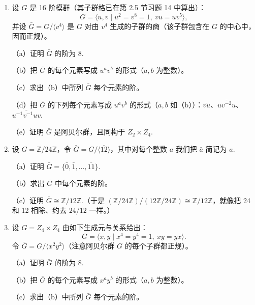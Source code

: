 \begin{enumerate}
（b）把 \(\bar{G}\) 的每个元素写成 \(\tau^a a^b\) 的形式（\(a, b\) 为整数）。

（c）求出（b）中所列 \(\bar{G}\) 每个元素的阶。

（d）把 \(\bar{G}\) 的下列每个元素写成 \(\tau^a a^b\) 的形式（\(a, b\) 如（b））：\(\overline{a\tau}\)、\(\overline{\tau a^{-2}\tau}\)、\(\overline{\tau^{-1}a^{-1}\tau a}\).

（e）证明 \(\bar{G} \cong D_8\).

\item 设 \(G\) 是 16 阶模群（其子群格已在第 2.5 节习题 14 中算出）：
\[
G = \langle u, v \mid u^2 = v^8 = 1,\ vu = uv^5 \rangle,
\]
并设 \(\bar{G} = G/\langle v^4 \rangle\) 是 \(G\) 对由 \(v^4\) 生成的子群的商（该子群包含在 \(G\) 的中心中，因而正规）。

（a）证明 \(\bar{G}\) 的阶为 8.

（b）把 \(\bar{G}\) 的每个元素写成 \(u^a v^b\) 的形式（\(a, b\) 为整数）。

（c）求出（b）中所列 \(\bar{G}\) 每个元素的阶。

（d）把 \(\bar{G}\) 的下列每个元素写成 \(u^a v^b\) 的形式（\(a, b\) 如（b））：\(\overline{vu}\)、\(\overline{uv^{-2}u}\)、\(\overline{u^{-1}v^{-1}uv}\).

（e）证明 \(\bar{G}\) 是阿贝尔群，且同构于 \(Z_2 \times Z_4\).

\item 设 \(G = \mathbb{Z}/24\mathbb{Z}\)，令 \(\bar{G} = G/\langle \overline{12} \rangle\)，其中对每个整数 \(a\) 我们把 \(\bar{a}\) 简记为 \(a\).

（a）证明 \(\bar{G} = \{\bar{0}, \bar{1}, \ldots, \overline{11}\}\).

（b）求出 \(\bar{G}\) 中每个元素的阶。

（c）证明 \(\bar{G} \cong \mathbb{Z}/12\mathbb{Z}\).（于是 \((\mathbb{Z}/24\mathbb{Z})/(12\mathbb{Z}/24\mathbb{Z}) \cong \mathbb{Z}/12\mathbb{Z}\)，就像把 24 和 12 相除、约去 \(24/12\) 一样。）

\item 设 \(G = Z_4 \times Z_4\) 由如下生成元与关系给出：
\[
G = \langle x, y \mid x^4 = y^4 = 1,\ xy = yx \rangle.
\]
令 \(\bar{G} = G/\langle x^2 y^2 \rangle\)（注意阿贝尔群 \(G\) 的每个子群都正规）。

（a）证明 \(\bar{G}\) 的阶为 8.

（b）把 \(\bar{G}\) 的每个元素写成 \(x^a y^b\) 的形式（\(a, b\) 为整数）。

（c）求出（b）中所列 \(\bar{G}\) 每个元素的阶。


\end{enumerate}

